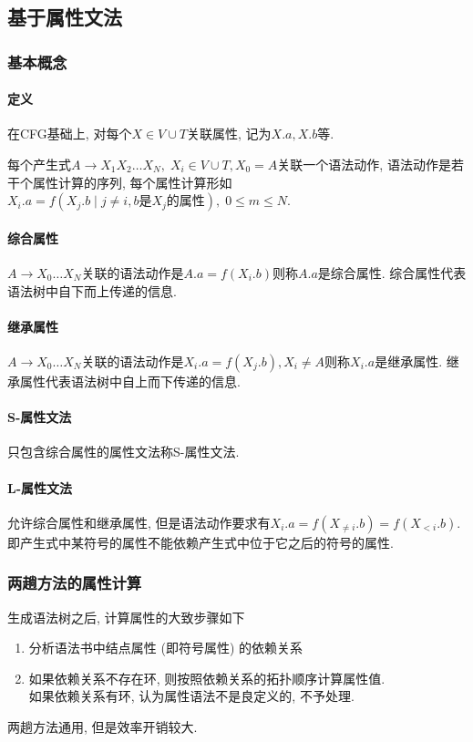 \documentclass{ctexart}
\begin{document}
\subsection{基于属性文法}
\subsubsection{基本概念}
\paragraph{定义}
    在CFG基础上, 对每个$X \in V \cup T$关联属性, 记为$X.a, X.b$等.\par
    每个产生式$A\to X_1 X_2 \ldots X_N,\; X_i \in V \cup T, X_0 = A$关联一个语法动作,
    语法动作是若干个属性计算的序列, 每个属性计算形如$X_i.a = f(X_j.b \;|\; j \neq i, b\text{是}X_j\text{的属性}),\; 0 \le m \le N$.
\paragraph{综合属性} $A \to X_0 \ldots X_N$关联的语法动作是$A.a = f(X_i.b)$则称$A.a$是综合属性.
    综合属性代表语法树中自下而上传递的信息.
\paragraph{继承属性} $A \to X_0 \ldots X_N$关联的语法动作是$X_i.a = f(X_j.b),X_i \neq A$则称$X_i.a$是继承属性.
    继承属性代表语法树中自上而下传递的信息.
\paragraph{S-属性文法} 只包含综合属性的属性文法称S-属性文法.
\paragraph{L-属性文法} 允许综合属性和继承属性, 但是语法动作要求有$X_i.a = f(X_{\neq i}.b) =f(X_{< i}.b)$.
    即产生式中某符号的属性不能依赖产生式中位于它之后的符号的属性.

\subsubsection{两趟方法的属性计算}
    生成语法树之后, 计算属性的大致步骤如下
    \begin{enumerate}
        \item 分析语法书中结点属性 (即符号属性) 的依赖关系
        \item 如果依赖关系不存在环, 则按照依赖关系的拓扑顺序计算属性值.\\
        如果依赖关系有环, 认为属性语法不是良定义的, 不予处理.\par
    \end{enumerate}
    两趟方法通用, 但是效率开销较大.
\end{document}
